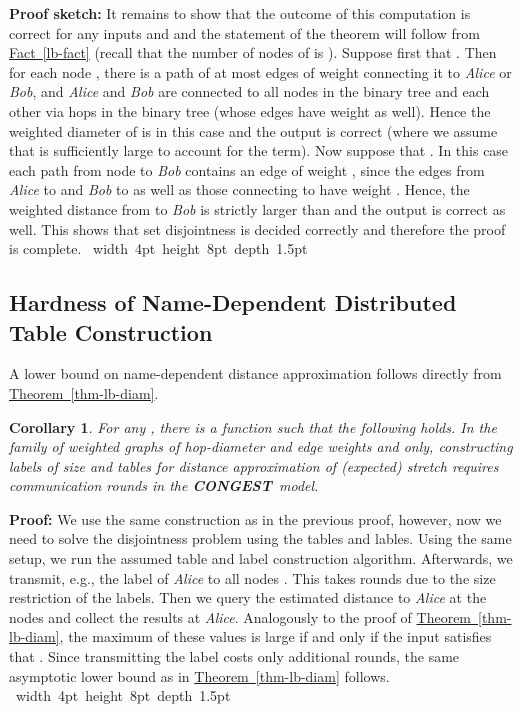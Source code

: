 \documentclass[letterpaper,11pt]{article}
\newcommand{\namedref}[2]{\hyperref[#2]{#1~\ref*{#2}}}
\newcommand{\theoremref}[1]{\namedref{Theorem}{#1}}
\newcommand{\factref}[1]{\namedref{Fact}{#1}}
\newtheorem{corollary}[theorem]{Corollary}
\newcommand{\blackslug}{\hbox{\hskip 1pt \vrule width 4pt height 8pt
depth 1.5pt \hskip 1pt}}
\newcommand{\QED}{\quad\blackslug\lower 8.5pt\null\par}
\newenvironment{proof}[1][Proof:]{\noindent \textbf{#1}\xspace}{\QED}
\newcommand{\CONGEST}{\textbf{CONGEST}}
\begin{document}
\begin{proof}[Proof sketch:]
It remains to show that the outcome of this computation is correct for any
inputs  and  and the statement of the theorem will follow from
\factref{lb-fact} (recall that the number of nodes of  is ).
Suppose first that . Then for each node , there is a
path of at most  edges of weight  connecting it to \emph{Alice} or
\emph{Bob}, and \emph{Alice} and \emph{Bob} are connected to all nodes in the
binary tree and each other via  hops in the binary tree (whose
edges have weight  as well). Hence the weighted diameter of  is
 in this case and the output is correct (where we assume
that  is sufficiently large to account for the  term). Now
suppose that . In this case each path from node  to
\emph{Bob} contains an edge of weight , since the edges from
\emph{Alice} to  and \emph{Bob} to  as well as those
connecting  to  have weight . Hence, the weighted
distance from  to \emph{Bob} is strictly larger than 
and the output is correct as well. This shows that set disjointness is decided
correctly and therefore the proof is complete.
\end{proof}


\subsection{Hardness of Name-Dependent Distributed Table Construction}
\label{sec:lb}

A lower bound on name-dependent distance approximation follows directly from
\theoremref{thm-lb-diam}.
\begin{corollary}\label{coro-lb2}
For any , there is a function  such that the following holds. In the family of
weighted graphs of hop-diameter  and edge weights 
and  only, constructing labels of size  and
tables for distance approximation of (expected) stretch  requires
 communication rounds in the \CONGEST\ model.
\end{corollary}
\begin{proof}
We use the same construction as in the previous proof, however, now we need to
solve the disjointness problem using the tables and lables. Using the same
setup, we run the assumed table and label construction algorithm. Afterwards, we
transmit, e.g., the label of \emph{Alice} to all nodes . This takes
 rounds due to the size restriction of the labels. Then we
query the estimated distance to \emph{Alice} at the nodes  and collect
the results at \emph{Alice}. Analogously to the proof of \theoremref{thm-lb-diam},
the maximum of these values is large if and only if the input satisfies that
. Since transmitting the label costs only
 additional rounds, the same asymptotic lower bound as in
\theoremref{thm-lb-diam} follows.
\end{proof}
\end{document}
